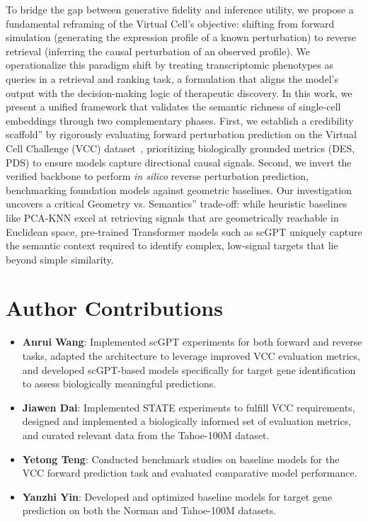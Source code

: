 \documentclass[conference]{IEEEtran}
\begin{document}
To bridge the gap between generative fidelity and inference utility, we propose a fundamental reframing of the Virtual Cell's objective: shifting from forward simulation (generating the expression profile of a known perturbation) to reverse retrieval (inferring the causal perturbation of an observed profile). We operationalize this paradigm shift by treating transcriptomic phenotypes as queries in a retrieval and ranking task, a formulation that aligns the model's output with the decision-making logic of therapeutic discovery. In this work, we present a unified framework that validates the semantic richness of single-cell embeddings through two complementary phases. First, we establish a credibility scaffold'' by rigorously evaluating forward perturbation prediction on the Virtual Cell Challenge (VCC) dataset~\cite{roohani_virtual_2025}, prioritizing biologically grounded metrics (DES, PDS) to ensure models capture directional causal signals. Second, we invert the verified backbone to perform \emph{in silico} reverse perturbation prediction, benchmarking foundation models against geometric baselines. Our investigation uncovers a critical Geometry vs. Semantics'' trade-off: while heuristic baselines like PCA-KNN excel at retrieving signals that are geometrically reachable in Euclidean space, pre-trained Transformer models such as scGPT uniquely capture the semantic context required to identify complex, low-signal targets that lie beyond simple similarity.


\section*{Author Contributions}
\begin{itemize}
    \item \textbf{Anrui Wang}: Implemented scGPT experiments for both forward and reverse tasks, adapted the architecture to leverage improved VCC evaluation metrics, and developed scGPT-based models specifically for target gene identification to assess biologically meaningful predictions.
    \item \textbf{Jiawen Dai}: Implemented STATE experiments to fulfill VCC requirements, designed and implemented a biologically informed set of evaluation metrics, and curated relevant data from the Tahoe-100M dataset.
    \item \textbf{Yetong Teng}: Conducted benchmark studies on baseline models for the VCC forward prediction task and evaluated comparative model performance.
    \item \textbf{Yanzhi Yin}: Developed and optimized baseline models for target gene prediction on both the Norman and Tahoe-100M datasets.
\end{itemize}
\end{document}
